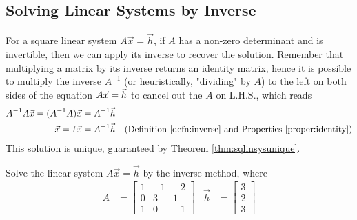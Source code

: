 \subsection{Solving Linear Systems by Inverse}
\label{subsection:SolLinSysInv}
For a square linear system $A\vec{x} = \vec{h}$, if $A$ has a non-zero determinant and is invertible, then we can apply its inverse to recover the solution. Remember that multiplying a matrix by its inverse returns an identity matrix, hence it is possible to multiply the inverse $A^{-1}$ (or heuristically, "dividing" by $A$) to the left on both sides of the equation $A\vec{x} = \smash{\vec{h}}$ to cancel out the $A$ on L.H.S., which reads
\begin{align}
A^{-1}A\vec{x}= (A^{-1}A)\vec{x} &= A^{-1}\vec{h} \nonumber \\
\vec{x} = \textcolor{gray}{I\vec{x}} &= A^{-1}\vec{h} &\text{(Definition \ref{defn:inverse} and Properties \ref{proper:identity})} \label{eqn:inversesol}
\end{align}
This solution is unique, guaranteed by Theorem \ref{thm:sqlinsysunique}.
\begin{exmp}
Solve the linear system $A\vec{x} = \vec{h}$ by the inverse method, where
\begin{align*}
A &=
\begin{bmatrix}
1 & -1 & -2 \\
0 & 3 & 1 \\
1 & 0 & -1
\end{bmatrix}
& \vec{h} &=
\begin{bmatrix}
3 \\
2 \\
3
\end{bmatrix}
\end{align*}
\end{exmp}
